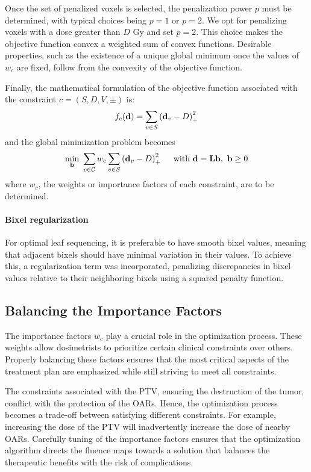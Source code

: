 Once the set of penalized voxels is selected, the penalization power $p$ must be determined, with typical choices being $p=1$ or $p=2$.
We opt for penalizing voxels with a dose greater than $D$ Gy and set $p=2$.
This choice makes the objective function convex a weighted sum of convex functions.
Desirable properties, such as the existence of a unique global minimum once the values of $w_c$ are fixed, follow from the convexity of the objective function.

Finally, the mathematical formulation of the objective function associated with the constraint $c = \left( S, D, V, \pm \right)$ is:
$$f_c(\mathbf{d}) = \sum_{v \in S} \left( {\mathbf{d}_v - D} \right)_+^2$$
and the global minimization problem becomes
$$
\min_{\mathbf{b}} \ \sum_{c \in \mathcal{C}} w_c \sum_{v \in S} \left( {\mathbf{d}_v - D} \right)_+^2
\quad \text{ with }
\mathbf{d} = \textbf{L}\mathbf{b}, \ \mathbf{b} \geq 0
$$
where $w_c$, the weights or importance factors of each constraint, are to be determined.

\paragraph{Bixel regularization}
For optimal leaf sequencing, it is preferable to have smooth bixel values, meaning that adjacent bixels should have minimal variation in their values.
To achieve this, a regularization term was incorporated, penalizing discrepancies in bixel values relative to their neighboring bixels using a squared penalty function.

\subsection{Balancing the Importance Factors}
The importance factors $w_c$ play a crucial role in the optimization process.
These weights allow dosimetrists to prioritize certain clinical constraints over others.
Properly balancing these factors ensures that the most critical aspects of the treatment plan are emphasized while still striving to meet all constraints.

The constraints associated with the PTV, ensuring the destruction of the tumor, conflict with the protection of the OARs.
Hence, the optimization process becomes a trade-off between satisfying different constraints.
For example, increasing the dose of the PTV will inadvertently increase the dose of nearby OARs.
Carefully tuning of the importance factors ensures that the optimization algorithm directs the fluence maps towards a solution that balances the therapeutic benefits with the risk of complications.


